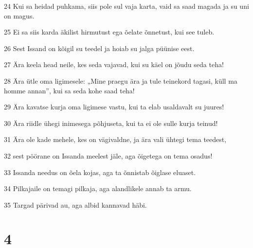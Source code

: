 \par 24 Kui sa heidad puhkama, siis pole sul vaja karta, vaid sa saad magada ja su uni on magus.
\par 25 Ei sa siis karda äkilist hirmutust ega õelate õnnetust, kui see tuleb.
\par 26 Sest Issand on kõigil su teedel ja hoiab su jalga püünise eest.
\par 27 Ära keela head neile, kes seda vajavad, kui su käel on jõudu seda teha!
\par 28 Ära ütle oma ligimesele: „Mine praegu ära ja tule teinekord tagasi, küll ma homme annan”, kui sa seda kohe saad teha!
\par 29 Ära kavatse kurja oma ligimese vastu, kui ta elab usaldavalt su juures!
\par 30 Ära riidle ühegi inimesega põhjuseta, kui ta ei ole sulle kurja teinud!
\par 31 Ära ole kade mehele, kes on vägivaldne, ja ära vali ühtegi tema teedest,
\par 32 sest pöörane on Issanda meelest jäle, aga õigetega on tema osadus!
\par 33 Issanda needus on õela kojas, aga ta õnnistab õiglase eluaset.
\par 34 Pilkajaile on temagi pilkaja, aga alandlikele annab ta armu.
\par 35 Targad pärivad au, aga albid kannavad häbi.

\chapter{4}

